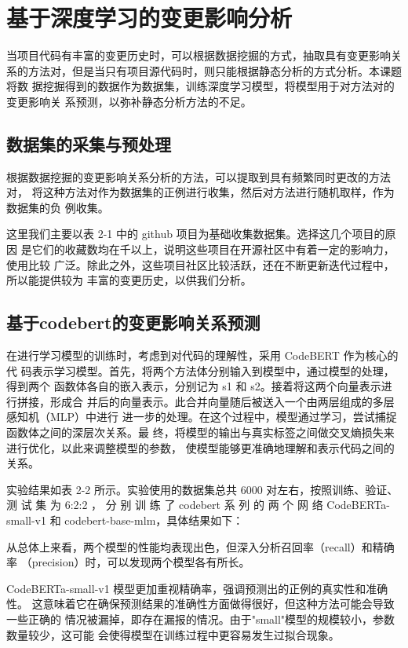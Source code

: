 \section{基于深度学习的变更影响分析}

当项目代码有丰富的变更历史时，可以根据数据挖掘的方式，抽取具有变更影响关
系的方法对，但是当只有项目源代码时，则只能根据静态分析的方式分析。本课题将数
据挖掘得到的数据作为数据集，训练深度学习模型，将模型用于对方法对的变更影响关
系预测，以弥补静态分析方法的不足。

\subsection{数据集的采集与预处理}

根据数据挖掘的变更影响关系分析的方法，可以提取到具有频繁同时更改的方法对，
将这种方法对作为数据集的正例进行收集，然后对方法进行随机取样，作为数据集的负
例收集。

这里我们主要以表 2-1 中的 github 项目为基础收集数据集。选择这几个项目的原因
是它们的收藏数均在千以上，说明这些项目在开源社区中有着一定的影响力，使用比较
广泛。除此之外，这些项目社区比较活跃，还在不断更新迭代过程中，所以能提供较为
丰富的变更历史，以供我们分析。

\subsection{基于codebert的变更影响关系预测}

在进行学习模型的训练时，考虑到对代码的理解性，采用 CodeBERT 作为核心的代
码表示学习模型。首先，将两个方法体分别输入到模型中，通过模型的处理，得到两个
函数体各自的嵌入表示，分别记为 s1 和 s2。接着将这两个向量表示进行拼接，形成合
并后的向量表示。此合并向量随后被送入一个由两层组成的多层感知机（MLP）中进行
进一步的处理。在这个过程中，模型通过学习，尝试捕捉函数体之间的深层次关系。最
终，将模型的输出与真实标签之间做交叉熵损失来进行优化，以此来调整模型的参数，
使模型能够更准确地理解和表示代码之间的关系。

实验结果如表 2-2 所示。实验使用的数据集总共 6000 对左右，按照训练、验证、测
试 集 为 6:2:2 ， 分 别 训 练 了 codebert 系 列 的 两 个 网 络 CodeBERTa-small-v1 和
codebert-base-mlm，具体结果如下：

从总体上来看，两个模型的性能均表现出色，但深入分析召回率（recall）和精确率
（precision）时，可以发现两个模型各有所长。

CodeBERTa-small-v1 模型更加重视精确率，强调预测出的正例的真实性和准确性。
这意味着它在确保预测结果的准确性方面做得很好，但这种方法可能会导致一些正确的
情况被漏掉，即存在漏报的情况。由于"small"模型的规模较小，参数数量较少，这可能
会使得模型在训练过程中更容易发生过拟合现象。

